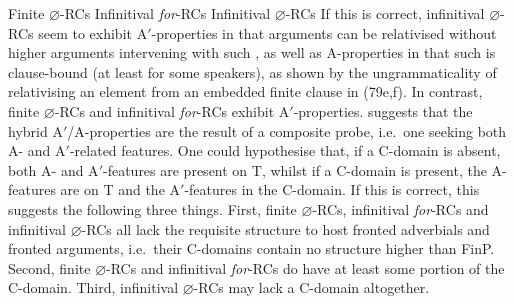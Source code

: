 \documentclass[output=paper]{langsci/langscibook}
\begin{document}
\ea\label{ex:key:2.77}  Finite $\varnothing$-\glspl{RC}
    \z
\z
\ea\label{ex:key:2.78}  Infinitival \emph{for}-\glspl{RC}
    \z
\z
\ea\label{ex:key:2.79}  Infinitival $\varnothing$-\glspl{RC}
    \z
\z
If this is correct, infinitival
$\varnothing${-\glspl{RC} seem to exhibit A$'$-properties in that arguments can
    be relativised without higher arguments intervening with such
    , as well as A-properties in that such  is
clause-bound (at least for some speakers)}, as shown by the ungrammaticality of
relativising an element from an embedded finite clause in (79e,f). In contrast,
finite $\varnothing${-\glspl{RC} and infinitival} \emph{for}-\glspl{RC} exhibit
A$'$-properties.  \textcite{Longenbaugh2016} suggests that the hybrid
A$'$/A-properties are the result of a composite probe, i.e.\ one seeking both A-
and A$'$-related features. One could hypothesise that, if a C-domain is absent,
both A- and A$'$-features are present on T, whilst if a C-domain is present, the
A-features are on T and the A$'$-features in the C-domain. If this is correct,
this suggests the following three things. First, finite $\varnothing${-RCs,
infinitival} \emph{for}{-\glspl{RC} and infinitival} $\varnothing$-\glspl{RC}
all lack the requisite structure to host fronted adverbials and fronted
arguments, i.e.\ their C-domains contain no structure higher than FinP. Second,
finite $\varnothing$-\glspl{RC} and infinitival \emph{for}-\glspl{RC} do have
at least some portion of the C-domain. Third, infinitival
$\varnothing$-\glspl{RC} may lack a C-domain altogether.
\end{document}
